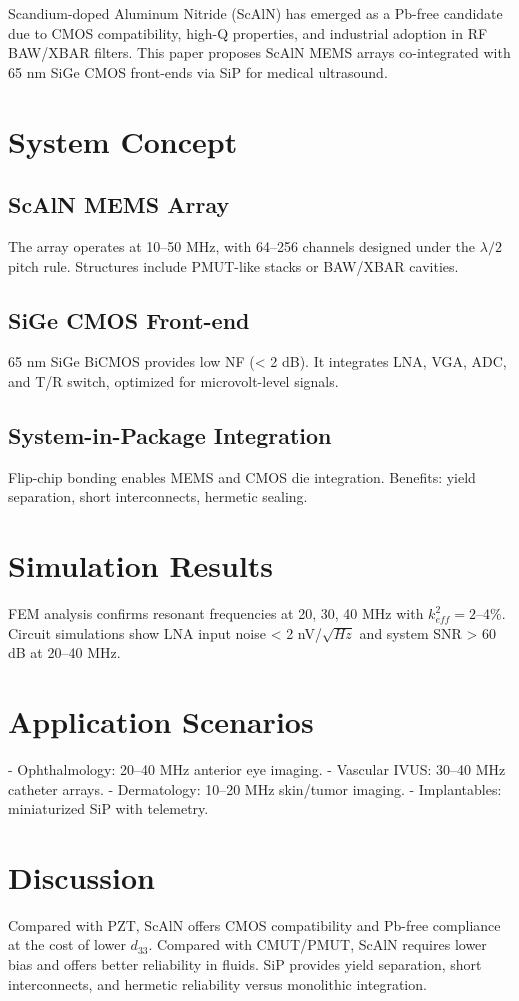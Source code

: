 \documentclass[conference]{IEEEtran}
\begin{document}
Scandium-doped Aluminum Nitride (ScAlN) has emerged as a Pb-free candidate due to CMOS compatibility, high-Q properties, and industrial adoption in RF BAW/XBAR filters.
This paper proposes ScAlN MEMS arrays co-integrated with 65 nm SiGe CMOS front-ends via SiP for medical ultrasound.

\section{System Concept}
\subsection{ScAlN MEMS Array}
The array operates at 10--50 MHz, with 64--256 channels designed under the $\lambda/2$ pitch rule. 
Structures include PMUT-like stacks or BAW/XBAR cavities.

\subsection{SiGe CMOS Front-end}
65 nm SiGe BiCMOS provides low NF (< 2 dB). 
It integrates LNA, VGA, ADC, and T/R switch, optimized for microvolt-level signals.

\subsection{System-in-Package Integration}
Flip-chip bonding enables MEMS and CMOS die integration. 
Benefits: yield separation, short interconnects, hermetic sealing.

\section{Simulation Results}
FEM analysis confirms resonant frequencies at 20, 30, 40 MHz with $k^2_{eff} = 2$--4\%. 
Circuit simulations show LNA input noise < 2 nV/$\sqrt{Hz}$ and system SNR > 60 dB at 20--40 MHz.

\section{Application Scenarios}
- Ophthalmology: 20--40 MHz anterior eye imaging.  
- Vascular IVUS: 30--40 MHz catheter arrays.  
- Dermatology: 10--20 MHz skin/tumor imaging.  
- Implantables: miniaturized SiP with telemetry.

\section{Discussion}
Compared with PZT, ScAlN offers CMOS compatibility and Pb-free compliance at the cost of lower $d_{33}$.  
Compared with CMUT/PMUT, ScAlN requires lower bias and offers better reliability in fluids.  
SiP provides yield separation, short interconnects, and hermetic reliability versus monolithic integration.
\end{document}
